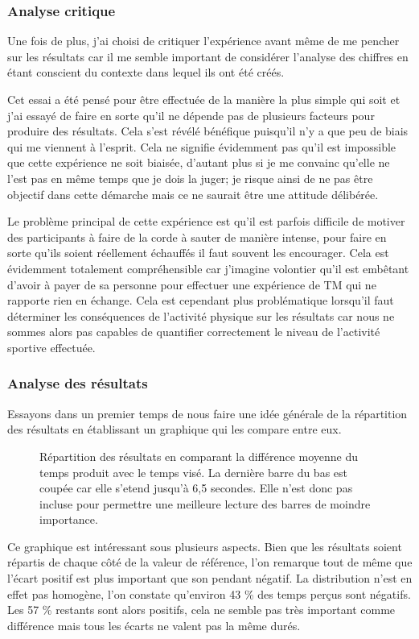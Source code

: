\documentclass[12pt,fleqn,oneside,french,openany]{book} %
\begin{document}
\subsubsection{Analyse critique} \label{sssec:analyseCrit2.2}
Une fois de plus, j'ai choisi de critiquer l'expérience avant même de me pencher sur les résultats car il me semble important de considérer l'analyse des chiffres en étant conscient du contexte dans lequel ils ont été créés. 

Cet essai a été pensé pour être effectuée de la manière la plus simple qui soit et j'ai essayé de faire en sorte qu'il ne dépende pas de plusieurs facteurs pour produire des résultats. Cela s'est révélé bénéfique puisqu'il n'y a que peu de biais qui me viennent à l'esprit. Cela ne signifie évidemment pas qu'il est impossible que cette expérience ne soit biaisée, d'autant plus si je me convainc qu'elle ne l'est pas en même temps que je dois la juger; je risque ainsi de ne pas être objectif dans cette démarche mais ce ne saurait être une attitude délibérée.

Le problème principal de cette expérience est qu'il est parfois difficile de motiver des participants à faire de la corde à sauter de manière intense, pour faire en sorte qu'ils soient réellement échauffés il faut souvent les encourager. Cela est évidemment totalement compréhensible car j'imagine volontier qu'il est embêtant d'avoir à payer de sa personne pour effectuer une expérience de TM qui ne rapporte rien en échange. Cela est cependant plus problématique lorsqu'il faut déterminer les conséquences de l'activité physique sur les résultats car nous ne sommes alors pas capables de quantifier correctement le niveau de l'activité sportive effectuée.

\subsubsection{Analyse des résultats} \label{sssec:analyseResult2.2}

Essayons dans un premier temps de nous faire une idée générale de la répartition des résultats en établissant un graphique qui les compare entre eux.

\begin{figure}[htp] %
	\caption{Répartition des résultats en comparant la différence moyenne du temps produit avec le temps visé. La dernière barre du bas est coupée car elle s'etend jusqu'à 6,5 secondes. Elle n'est donc pas incluse pour permettre une meilleure lecture des barres de moindre importance.}
\end{figure}
Ce graphique est intéressant sous plusieurs aspects. Bien que les résultats soient répartis de chaque côté de la valeur de référence, l'on remarque tout de même que l'écart positif est plus important que son pendant négatif. La distribution n'est en effet pas homogène, l'on constate qu'environ 43 \% des temps perçus sont négatifs. Les 57 \% restants sont alors positifs, cela ne semble pas très important comme différence mais tous les écarts ne valent pas la même durés.
\end{document}
